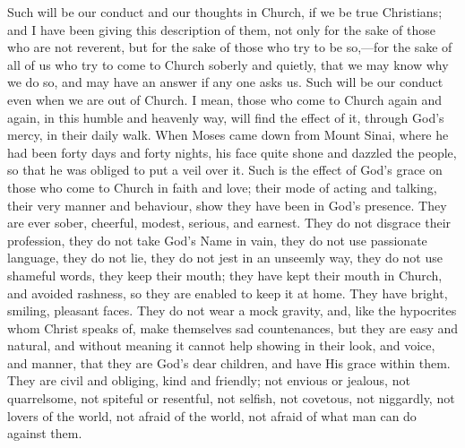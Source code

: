 Such will be our conduct and our thoughts in Church, if we be true
Christians; and I have been giving this description of them, not only
for the sake of those who are not reverent, but for the sake of those
who try to be so,—for the sake of all of us who try to come to
Church soberly and quietly, that we may know why we do so, and may
have an answer if any one asks us. Such will be our conduct even when
we are out of Church. I mean, those who come to Church again and
again, in this humble and heavenly way, will find the effect of it,
through God's mercy, in their daily walk. When Moses came down from
Mount Sinai, where he had been forty days and forty nights, his face
quite shone and dazzled the people, so that he was obliged to put a
veil over it. Such is the effect of God's grace on those who come to
Church in faith and love; their mode of acting and talking, their very
manner and behaviour, show they have been in God's presence. They are
ever sober, cheerful, modest, serious, and earnest. They do not
disgrace their profession, they do not take God's Name in vain, they
do not use passionate language, they do not lie, they do not jest in
an unseemly way, they do not use shameful words, they keep their
mouth; they have kept their mouth in Church, and avoided rashness, so
they are enabled to keep it at home. They have bright, smiling,
pleasant faces. They do not wear a mock gravity, and, like the
hypocrites whom Christ speaks of, make themselves sad countenances,
but they are easy and natural, and without meaning it cannot help
showing in their look, and voice, and manner, that they are God's dear
children, and have His grace within them. They are civil and obliging,
kind and friendly; not envious or jealous, not quarrelsome, not
spiteful or resentful, not selfish, not covetous, not niggardly, not
lovers of the world, not afraid of the world, not afraid of what man
can do against them.


